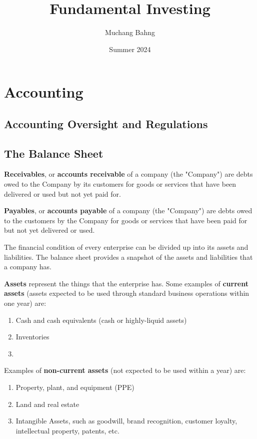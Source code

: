 \documentclass{article}
\begin{document}
\title{Fundamental Investing}
\author{Muchang Bahng}
\date{Summer 2024}

\maketitle
\tableofcontents
\pagebreak

\section{Accounting}

  \subsection{Accounting Oversight and Regulations}

  \subsection{The Balance Sheet}

    \begin{definition}
      \textbf{Receivables}, or \textbf{accounts receivable} of a company (the "Company") are debts owed to the Company by its customers for goods or services that have been delivered or used but not yet paid for. 

      \textbf{Payables}, or \textbf{accounts payable} of a company (the "Company") are debts owed to the customers by the Company for goods or services that have been paid for but not yet delivered or used. 
    \end{definition}

    The financial condition of every enterprise can be divided up into its assets and liabilities. The balance sheet provides a snapshot of the assets and liabilities that a company has. 

    \begin{definition}[Assets]
      \textbf{Assets} represent the things that the enterprise has. Some examples of \textbf{current assets} (assets expected to be used through standard business operations within one year) are: 
      \begin{enumerate}
        \item Cash and cash equivalents (cash or highly-liquid assets)
        \item Inventories
        \item
      \end{enumerate}
      Examples of \textbf{non-current assets} (not expected to be used within a year) are: 
      \begin{enumerate}
        \item Property, plant, and equipment (PPE)
        \item Land and real estate
        \item Intangible Assets, such as goodwill, brand recognition, customer loyalty, intellectual property, patents, etc. 
      \end{enumerate}
    \end{definition}
\end{document}
